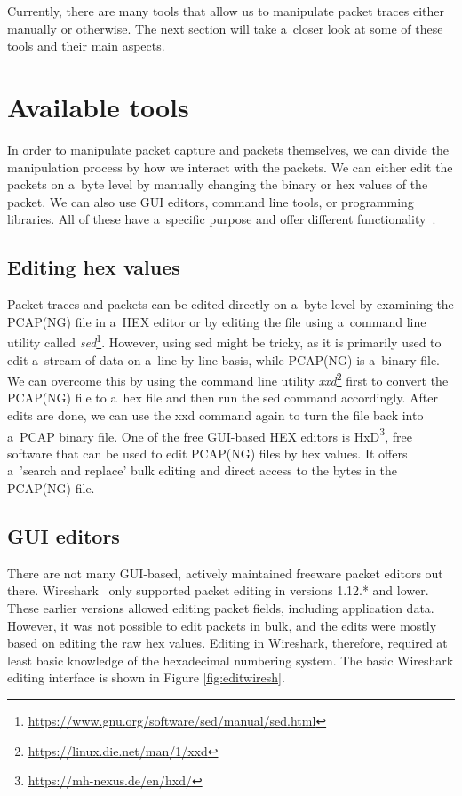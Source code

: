 \documentclass[
  printed,     %
  color,       %
  oneside,     %
  nosansbold,  %
  nocolorbold, %
  nolof,         %
  nolot,         %
]{fithesis4}
\begin{document}
Currently, there are many tools that allow us to manipulate packet traces either manually or otherwise. The next section will take a~closer look at some of these tools and their main aspects.


\section{Available tools}

In order to manipulate packet capture and packets themselves, we can divide the manipulation process by how we interact with the packets. We can either edit the packets on a~byte level by manually changing the binary or hex values of the packet. We can also use GUI editors, command line tools, or programming libraries. All of these have a~specific purpose and offer different functionality~\cite{Howcanne5:online}.

\subsection{Editing hex values}

Packet traces and packets can be edited directly on a~byte level by examining the PCAP(NG) file in a~HEX editor or by editing the file using a~command line utility called \textit{sed}\footnote{\url{https://www.gnu.org/software/sed/manual/sed.html}}. However, using sed might be tricky, as it is primarily used to edit a~stream of data on a~line-by-line basis, while PCAP(NG) is a~binary file. We can overcome this by using the command line utility \textit{xxd}\footnote{\url{https://linux.die.net/man/1/xxd}} first to convert the PCAP(NG) file to a~hex file and then run the sed command accordingly. After edits are done, we can use the xxd command again to turn the file back into a~PCAP binary file. One of the free GUI-based HEX editors is HxD\footnote{\url{https://mh-nexus.de/en/hxd/}}, free software that can be used to edit PCAP(NG) files by hex values. It offers a~'search and replace' bulk editing and direct access to the bytes in the PCAP(NG) file.

\subsection{GUI editors}

There are not many GUI-based, actively maintained freeware packet editors out there. Wireshark~\cite{Wireshar89:online} only supported packet editing in versions 1.12.* and lower. These earlier versions allowed editing packet fields, including application data. However, it was not possible to edit packets in bulk, and the edits were mostly based on editing the raw hex values. Editing in Wireshark, therefore, required at least basic knowledge of the hexadecimal numbering system. The basic Wireshark editing interface is shown in Figure \ref{fig:editwiresh}.
\end{document}
